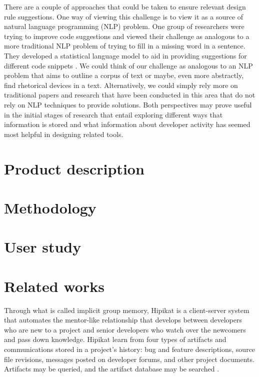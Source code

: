 \documentclass[12pt]{article}
\begin{document}
There are a couple of approaches that could be taken to ensure relevant design rule suggestions. One way of viewing this challenge is to view it as a source of natural language programming (NLP) problem. One group of researchers were trying to improve code suggestions and viewed their challenge as analogous to a more traditional NLP problem of trying to fill in a missing word in a sentence. They developed a statistical language model to aid in providing suggestions for different code snippets \cite{RaychevEtAl2014}. We could think of our challenge as analogous to an NLP problem that aims to outline a corpus of text or maybe, even more abstractly, find rhetorical devices in a text. Alternatively, we could simply rely more on traditional papers and research that have been conducted in this area that do not rely on NLP techniques to provide solutions. Both perspectives may prove useful in the initial stages of research that entail exploring different ways that information is stored and what information about developer activity has seemed most helpful in designing related tools.






\clearpage
\section{Product description}



\clearpage


\section{Methodology}



\clearpage

\section{User study}



\clearpage

\section{Related works}

Through what is called implicit group memory, Hipikat is a client-server system that automates the mentor-like relationship that develops between developers who are new to a project and senior developers who watch over the newcomers and pass down knowledge. Hipikat learn from four types of artifacts and communications stored in a project's history: bug and feature descriptions, source file revisions, messages posted on developer forums, and other project documents. Artifacts may be queried, and the artifact database may be searched \cite{CubranicAndMurphy2003}.
\end{document}
